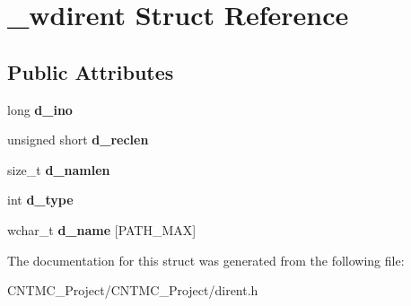 \hypertarget{struct__wdirent}{}\section{\+\_\+wdirent Struct Reference}
\label{struct__wdirent}
\subsection*{Public Attributes}
\begin{DoxyCompactItemize}
\item 
\hypertarget{struct__wdirent_ac8cfaf294a0b6a49287d3f384c280c93}{}long {\bfseries d\+\_\+ino}\label{struct__wdirent_ac8cfaf294a0b6a49287d3f384c280c93}

\item 
\hypertarget{struct__wdirent_aff7f360608e576cd18cf11f2caf13ef3}{}unsigned short {\bfseries d\+\_\+reclen}\label{struct__wdirent_aff7f360608e576cd18cf11f2caf13ef3}

\item 
\hypertarget{struct__wdirent_a0050d6131e6fa90206903e216b38799e}{}size\+\_\+t {\bfseries d\+\_\+namlen}\label{struct__wdirent_a0050d6131e6fa90206903e216b38799e}

\item 
\hypertarget{struct__wdirent_a3c3874604ffccbeeaffd96709763cc3b}{}int {\bfseries d\+\_\+type}\label{struct__wdirent_a3c3874604ffccbeeaffd96709763cc3b}

\item 
\hypertarget{struct__wdirent_a267f915cd36cad5969337a9192cab567}{}wchar\+\_\+t {\bfseries d\+\_\+name} \mbox{[}P\+A\+T\+H\+\_\+\+M\+A\+X\mbox{]}\label{struct__wdirent_a267f915cd36cad5969337a9192cab567}

\end{DoxyCompactItemize}


The documentation for this struct was generated from the following file\+:\begin{DoxyCompactItemize}
\item 
C\+N\+T\+M\+C\+\_\+\+Project/\+C\+N\+T\+M\+C\+\_\+\+Project/dirent.\+h\end{DoxyCompactItemize}
